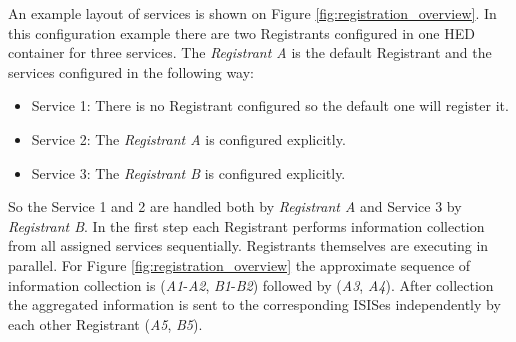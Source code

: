 \documentclass{book}
\begin{document}
An example layout of services is shown on Figure \ref{fig:registration_overview}. In this configuration example 
there are two Registrants configured in one HED container for three services. The \textit{Registrant A} is the 
default Registrant and the services configured in the following way:

\begin{itemize}
  \item Service 1: There is no Registrant configured so the default one will register it.
  \item Service 2: The \textit{Registrant A} is configured explicitly.
  \item Service 3: The \textit{Registrant B} is configured explicitly.
\end{itemize}

So the Service 1 and 2 are handled both by \textit{Registrant A} and Service 3 by \textit{Registrant B}.
In the first step each Registrant performs information collection from all assigned services sequentially. Registrants themselves are executing in parallel. For Figure \ref{fig:registration_overview} the approximate sequence of information collection is (\textit{A1}-\textit{A2}, \textit{B1}-\textit{B2}) followed by (\textit{A3}, \textit{A4}). After collection  the aggregated information is sent to the corresponding ISISes independently by each other Registrant (\textit{A5}, \textit{B5}).

\begin{figure}[ht]
\end{figure}
\end{document}
